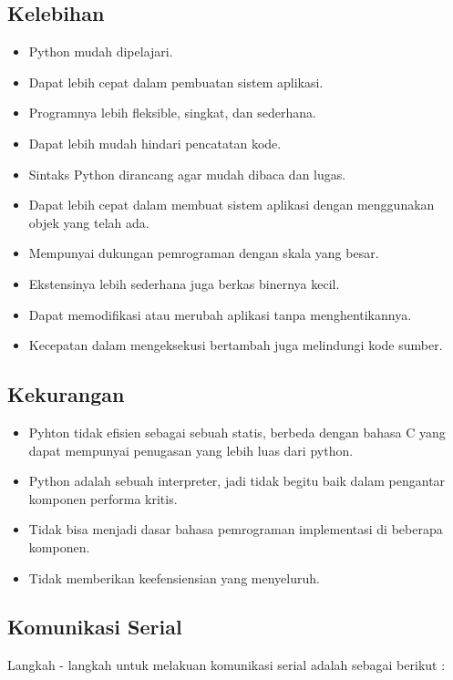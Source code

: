 	\subsection{Kelebihan}
		\begin{itemize}
			\item Python mudah dipelajari.
			\item Dapat lebih cepat dalam pembuatan sistem aplikasi.
			\item Programnya lebih fleksible, singkat, dan sederhana.
			\item Dapat lebih mudah hindari pencatatan kode.
			\item Sintaks Python dirancang agar mudah dibaca dan lugas.
			\item Dapat lebih cepat dalam membuat sistem aplikasi dengan menggunakan objek yang telah ada.
			\item Mempunyai dukungan pemrograman dengan skala yang besar.
			\item Ekstensinya lebih sederhana juga berkas binernya kecil.
			\item Dapat memodifikasi atau merubah aplikasi tanpa menghentikannya.
			\item Kecepatan dalam mengeksekusi bertambah juga melindungi kode sumber.
		\end{itemize}
		
	\subsection{Kekurangan}
		\begin{itemize}
			\item Pyhton tidak efisien sebagai sebuah statis, berbeda dengan bahasa C yang dapat mempunyai penugasan yang lebih luas dari python.
			\item Python adalah sebuah interpreter, jadi tidak begitu baik dalam pengantar komponen performa kritis.
			\item Tidak bisa menjadi dasar bahasa pemrograman implementasi di beberapa komponen.
			\item Tidak memberikan keefensiensian yang menyeluruh.
		\end{itemize}
		
	\subsection{Komunikasi Serial}
		Langkah - langkah untuk melakuan komunikasi serial adalah sebagai berikut :
		
